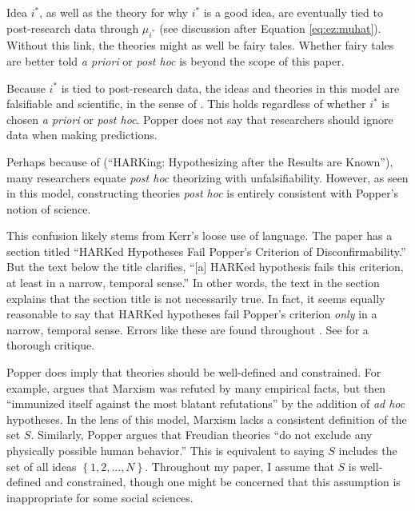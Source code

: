 \documentclass[12pt,english]{article}
\theoremstyle{plain}
\theoremstyle{plain}
\begin{document}
Idea $i^\ast$, as well as the theory for why $i^\ast$ is a good idea, are eventually tied to post-research data through $\mu_{i^\ast}$ (see discussion after Equation \eqref{eq:ez:muhat}).  Without this link, the theories might as well be fairy tales. Whether fairy tales are better told \emph{a priori} or \emph{post hoc} is beyond the scope of this paper.

Because $i^\ast$ is tied to post-research data, the ideas and theories in this model are falsifiable and scientific, in the sense of \citet{Popper1959}. This holds regardless of whether $i^\ast$ is chosen \emph{a priori} or \emph{post hoc}. Popper does not say that researchers should ignore data when making predictions.


Perhaps because of \citet{kerr1998harking} (``HARKing: Hypothesizing after the Results are Known''), many researchers equate \emph{post hoc} theorizing with unfalsifiability. However, as seen in this model, constructing theories \emph{post hoc} is entirely consistent with Popper's notion of science. 

This confusion likely stems from Kerr's loose use of language. The paper has a section titled  ``HARKed Hypotheses Fail Popper's Criterion of Disconfirmability.'' But the text below the title clarifies, ``[a] HARKed hypothesis fails this criterion, at least in a narrow, temporal sense.'' In other words, the text in the section explains that the section title is not necessarily true. In fact, it seems equally reasonable to say that HARKed hypotheses fail Popper's criterion \emph{only} in a narrow, temporal sense.  Errors like these are found throughout \citet{kerr1998harking}. See \citet{rubin2022costs} for a thorough critique.



Popper does imply that theories should be well-defined and constrained.  For example, \citet{Popper1985} argues that Marxism was refuted by many empirical facts, but then ``immunized itself against the most blatant refutations'' by the addition of \emph{ad hoc} hypotheses. In the lens of this model, Marxism lacks a consistent definition of the set $S$. Similarly, Popper argues that Freudian theories ``do not exclude any physically possible human behavior.'' This is equivalent to saying $S$ includes the set of all ideas $\left\{1,2,...,N\right\}$. Throughout my paper, I assume that $S$ is well-defined and constrained, though one might be concerned that this assumption is inappropriate for some social sciences.
\end{document}
